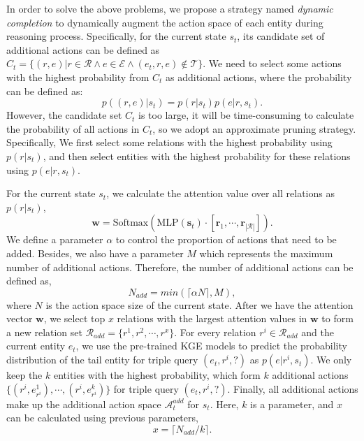 \documentclass[11pt,a4paper]{article}
\begin{document}
In order to solve the above problems, we propose a strategy named \textit{dynamic completion} to dynamically augment the action space of each entity during reasoning process. Specifically, for the current state $s_t$, its candidate set of additional actions can be defined as $C_{t} = \{(r, e) | r \in \mathcal{R} \wedge e \in \mathcal{E} \wedge (e_t, r, e) \not\in \mathcal{T}\}$. We need to select some actions with the highest probability from $C_{t}$ as additional actions, where the probability can be defined as:
\begin{equation}
  p((r, e) | s_t) = p(r | s_t) p(e | r, s_t) .
\end{equation}
However, the candidate set $C_t$ is too large, it will be time-consuming to calculate the probability of all actions in $C_t$, so we adopt an approximate pruning strategy. Specifically, We first select some relations with the highest probability using $p(r | s_t)$, and then select entities with the highest probability for these relations using $p(e | r, s_t)$.

For the current state $s_t$, we calculate the attention value over all relations as $p(r | s_t)$,
\begin{equation}
  \mathbf{w} = \text{Softmax}(\text{MLP}(\mathbf{s}_t) \cdot [\mathbf{r}_1, \cdots, \mathbf{r}_{|\mathcal{R}|}]) .
\end{equation}
We define a parameter $\alpha$ to control the proportion of actions that need to be added. Besides, we also have a parameter $M$ which represents the maximum number of additional actions. Therefore, the number of additional actions can be defined as,
\begin{equation}
  N_{add} = min(\lceil \alpha N \rceil, M) ,
\end{equation}
where $N$ is the action space size of the current state.
After we have the attention vector $\mathbf{w}$, we select top $x$ relations with the largest attention values in $\mathbf{w}$ to form a new relation set $\mathcal{R}_{add} = \{r^1, r^2, \cdots, r^x\}$. For every relation $r^i \in \mathcal{R}_{add}$ and the current entity $e_t$, we use the pre-trained KGE models to predict the probability distribution of the tail entity for triple query $(e_t, r^i, ?)$ as $p(e | r^i, s_t)$. We only keep the $k$ entities with the highest probability, which form $k$ additional actions $\{(r^i, e_{r^i}^{1}), \cdots, (r^i, e_{r^i}^{k})\}$ for triple query $(e_t, r^i, ?)$. Finally, all additional actions make up the additional action space $\mathcal{A}_t^{add}$ for $s_t$. Here, $k$ is a parameter, and $x$ can be calculated using previous parameters, 
\begin{equation}
  x = \lceil N_{add} / k \rceil .
\end{equation}
\end{document}
